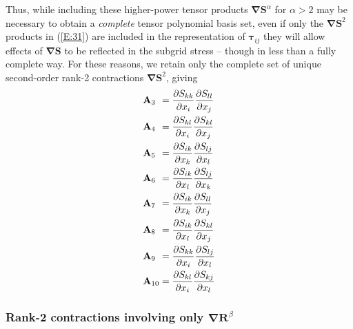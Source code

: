 Thus, while including these higher-power tensor products $\mathbf{\nabla S}^{\alpha}$   for $\alpha > 2$  may be necessary to obtain a \textit{complete} tensor polynomial basis set, even if only the $\mathbf{\nabla S}^2$   products in (\ref{E:31}) are included in the representation of $\mathbf{\tau}_{ij}$  they will allow effects of $\mathbf{\nabla S}$   to be reflected in the subgrid stress – though in less than a fully complete way.  For these reasons, we retain only the complete set of unique second-order rank-2 contractions $\mathbf{\nabla S}^2$, giving
%
\begin{subequations}
\label{E:33}
\begin{align}
	\mathmakebox[\widthof{$\mathbf{A}_{10}$}][l]{{\mathbf{A}_3}}
	&= \frac{\partial S_{kk}}{\partial x_i}
	   \frac{\partial S_{ll}}{\partial x_j} \\
	\mathmakebox[\widthof{$\mathbf{A}_{10}$}][l]{\mathbf{A}_4}  
	&= \frac{\partial S_{kl}}{\partial x_i}
	   \frac{\partial S_{kl}}{\partial x_j} \\
	\mathmakebox[\widthof{$\mathbf{A}_{10}$}][l]{\mathbf{A}_5}
	&= \frac{\partial S_{ik}}{\partial x_k}
	   \frac{\partial S_{lj}}{\partial x_l} \\
	\mathmakebox[\widthof{$\mathbf{A}_{10}$}][l]{\mathbf{A}_6}
	&= \frac{\partial S_{ik}}{\partial x_l}
	   \frac{\partial S_{lj}}{\partial x_k} \\
	\mathmakebox[\widthof{$\mathbf{A}_{10}$}][l]{\mathbf{A}_7}
	&= \frac{\partial S_{ik}}{\partial x_k}
	   \frac{\partial S_{ll}}{\partial x_j} \\
	\mathmakebox[\widthof{$\mathbf{A}_{10}$}][l]{\mathbf{A}_8}
	&= \frac{\partial S_{ik}}{\partial x_l}
	   \frac{\partial S_{kl}}{\partial x_j} \\
	\mathmakebox[\widthof{$\mathbf{A}_{10}$}][l]{\mathbf{A}_9}
	&= \frac{\partial S_{kk}}{\partial x_i}
	   \frac{\partial S_{lj}}{\partial x_l} \\
	\mathmakebox[\widthof{$\mathbf{A}_{10}$}][l]{\mathbf{A}_{10}}
	&= \frac{\partial S_{kl}}{\partial x_i}
	   \frac{\partial S_{kj}}{\partial x_l}
\end{align}
\end{subequations}
%
%    
	 	
\subsubsection{Rank-2 contractions involving only $\mathbf{\nabla R}^{\beta}$}
\label{sec:2C2}

